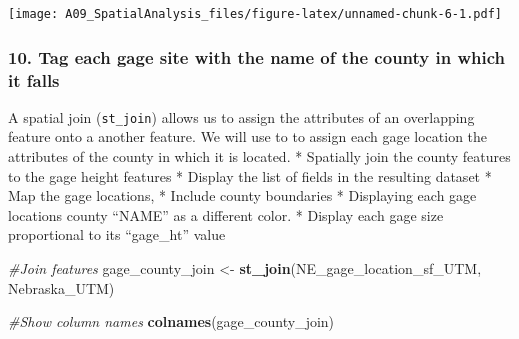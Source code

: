 \documentclass[]{article}
\newenvironment{Shaded}{\begin{snugshade}}{\end{snugshade}}
\newcommand{\KeywordTok}[1]{\textcolor[rgb]{0.13,0.29,0.53}{\textbf{#1}}}
\newcommand{\DataTypeTok}[1]{\textcolor[rgb]{0.13,0.29,0.53}{#1}}
\newcommand{\StringTok}[1]{\textcolor[rgb]{0.31,0.60,0.02}{#1}}
\newcommand{\CommentTok}[1]{\textcolor[rgb]{0.56,0.35,0.01}{\textit{#1}}}
\newcommand{\OtherTok}[1]{\textcolor[rgb]{0.56,0.35,0.01}{#1}}
\newcommand{\OperatorTok}[1]{\textcolor[rgb]{0.81,0.36,0.00}{\textbf{#1}}}
\newcommand{\NormalTok}[1]{#1}
\begin{document}
\begin{Shaded}
\end{Shaded}

\texttt{[image: A09\_SpatialAnalysis\_files/figure-latex/unnamed-chunk-6-1.pdf]}

\subsubsection{10. Tag each gage site with the name of the county in
which it
falls}\label{tag-each-gage-site-with-the-name-of-the-county-in-which-it-falls}

A spatial join (\texttt{st\_join}) allows us to assign the attributes of
an overlapping feature onto a another feature. We will use to to assign
each gage location the attributes of the county in which it is located.
* Spatially join the county features to the gage height features *
Display the list of fields in the resulting dataset * Map the gage
locations, * Include county boundaries * Displaying each gage locations
county ``NAME'' as a different color. * Display each gage size
proportional to its ``gage\_ht'' value

\begin{Shaded}
\begin{Highlighting}[]
\CommentTok{#Join features}
\NormalTok{gage_county_join <-}\StringTok{ }\KeywordTok{st_join}\NormalTok{(NE_gage_location_sf_UTM, Nebraska_UTM)}

\CommentTok{#Show column names}
\KeywordTok{colnames}\NormalTok{(gage_county_join)}
\end{Highlighting}
\end{Shaded}
\end{document}
